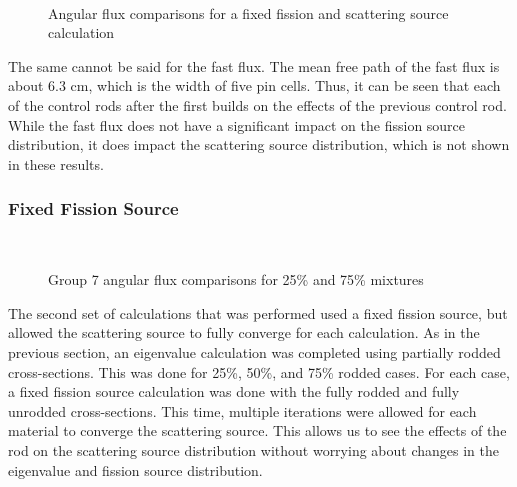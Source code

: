 \begin{figure}[H]
    \centering
    ~
    \caption{Angular flux comparisons for a fixed fission and scattering source calculation}\label{f:1dmoc-fixed-50-angflux}
\end{figure}

The same cannot be said for the fast flux.  The mean free path of the fast flux is about 6.3 cm, which is the width of five pin cells.  Thus, it can be seen that each of the control rods after the first builds on the effects of the previous control rod.  While the fast flux does not have a significant impact on the fission source distribution, it does impact the scattering source distribution, which is not shown in these results.

\subsubsection{Fixed Fission Source}

\begin{figure}[H]
    \centering
    \hfill
    ~
    \caption{Group 7 angular flux comparisons for 25\% and 75\% mixtures}\label{f:1dmoc-angflux7}
\end{figure}

The second set of calculations that was performed used a fixed fission source, but allowed the scattering source to fully converge for each calculation.  As in the previous section, an eigenvalue calculation was completed using partially rodded cross-sections.  This was done for 25\%, 50\%, and 75\% rodded cases.  For each case, a fixed fission source calculation was done with the fully rodded and fully unrodded cross-sections.  This time, multiple iterations were allowed for each material to converge the scattering source.  This allows us to see the effects of the rod on the scattering source distribution without worrying about changes in the eigenvalue and fission source distribution.

